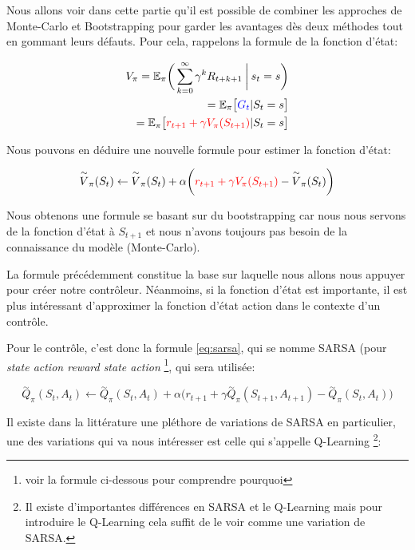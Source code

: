 Nous allons voir dans cette partie qu'il est possible de combiner les approches de Monte-Carlo et Bootstrapping pour garder les avantages dès deux méthodes tout en gommant leurs défauts. Pour cela, rappelons la formule de la fonction d'état: 

\begin{align*}
V_{\pi} = \mathbb{E_\pi}\bigg(\sum_{k=0}^{\infty} \gamma^kR_{t+k+1} \:\bigg\vert\: s_t=s \bigg) \\
= \mathbb{E}_\pi \big[\textcolor{blue}{G_t} \vert S_t = s\big] \\
= \mathbb{E}_\pi \big[\textcolor{red}{r_{t+1} + \gamma V_{\pi}(S_{t+1})} \vert S_t = s\big]
\end{align*}
 
Nous pouvons en déduire une nouvelle formule pour estimer la fonction d'état:
 
\begin{equation}
\overset{\sim}{V}_{\pi}(S_t) \leftarrow \overset{\sim}{V}_{\pi}(S_t) + \alpha \bigg(\textcolor{red}{r_{t+1} + \gamma V_{\pi}(S_{t+1})} - \overset{\sim}{V}_{\pi}(S_t)\bigg)
\end{equation}

Nous obtenons une formule se basant sur du bootstrapping car nous nous servons de la fonction d'état à $S_{t+1}$ et nous n'avons toujours pas besoin de la connaissance du modèle (Monte-Carlo).

La formule précédemment constitue la base sur laquelle nous allons nous appuyer pour créer notre contrôleur. Néanmoins, si la fonction d'état est importante, il est plus intéressant d'approximer la fonction d'état action dans le contexte d'un contrôle.

Pour le contrôle, c'est donc la formule \ref{eq:sarsa}, qui se nomme SARSA (pour \emph{state action reward state action} \footnote{voir la formule ci-dessous pour comprendre pourquoi}, qui sera utilisée:

\begin{equation}\label{eq:sarsa}
\overset{\sim}{Q}_{\pi}(S_t, A_t) \leftarrow \overset{\sim}{Q}_{\pi}(S_t, A_t) + \alpha \bigg(r_{t+1} + \gamma \overset{\sim}{Q}_{\pi}(S_{t+1}, A_{t+1}) - \overset{\sim}{Q}_{\pi}(S_t, A_t)\bigg)
\end{equation}

Il existe dans la littérature une pléthore de variations de SARSA en particulier, une des variations qui va nous intéresser est celle qui s'appelle Q-Learning \cite{Watkins92q-learning}\footnote{Il existe d'importantes différences en SARSA et le Q-Learning mais pour introduire le Q-Learning cela suffit de le voir comme une variation de SARSA.}: 

